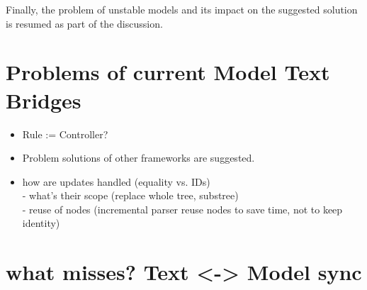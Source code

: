 Finally, the problem of unstable models and its impact on the suggested solution is resumed as part of the discussion.

\section{Problems of current Model Text Bridges}
\begin{itemize}
	\item Rule := Controller?
	\item Problem solutions of other frameworks are suggested.
\item how are updates handled (equality vs. IDs) \\
		- what's their scope (replace whole tree, substree) \\
		-	reuse of nodes (incremental parser reuse nodes to save time, not to keep identity)
\end{itemize}	

\section{what misses? Text <-> Model sync}


